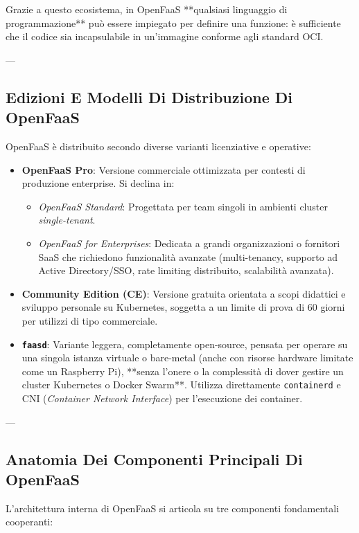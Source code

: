 \documentclass[11pt, a4paper]{article}
\begin{document}
Grazie a questo ecosistema, in OpenFaaS **qualsiasi linguaggio di programmazione** può essere impiegato per definire una funzione: è sufficiente che il codice sia incapsulabile in un'immagine conforme agli standard OCI.

---

\subsection{Edizioni E Modelli Di Distribuzione Di OpenFaaS}

OpenFaaS è distribuito secondo diverse varianti licenziative e operative:
\begin{itemize}
    \item \textbf{OpenFaaS Pro}: Versione commerciale ottimizzata per contesti di produzione enterprise. Si declina in:
    \begin{itemize}[noitemsep]
        \item \emph{OpenFaaS Standard}: Progettata per team singoli in ambienti cluster \emph{single-tenant}.
        \item \emph{OpenFaaS for Enterprises}: Dedicata a grandi organizzazioni o fornitori SaaS che richiedono funzionalità avanzate (multi-tenancy, supporto ad Active Directory/SSO, rate limiting distribuito, scalabilità avanzata).
    \end{itemize}
    \item \textbf{Community Edition (CE)}: Versione gratuita orientata a scopi didattici e sviluppo personale su Kubernetes, soggetta a un limite di prova di 60 giorni per utilizzi di tipo commerciale.
    \item \textbf{\texttt{faasd}}: Variante leggera, completamente open-source, pensata per operare su una singola istanza virtuale o bare-metal (anche con risorse hardware limitate come un Raspberry Pi), **senza l'onere o la complessità di dover gestire un cluster Kubernetes o Docker Swarm**. Utilizza direttamente \texttt{containerd} e CNI (\emph{Container Network Interface}) per l'esecuzione dei container.
\end{itemize}

---

\subsection{Anatomia Dei Componenti Principali Di OpenFaaS}

L'architettura interna di OpenFaaS si articola su tre componenti fondamentali cooperanti:
\end{document}
